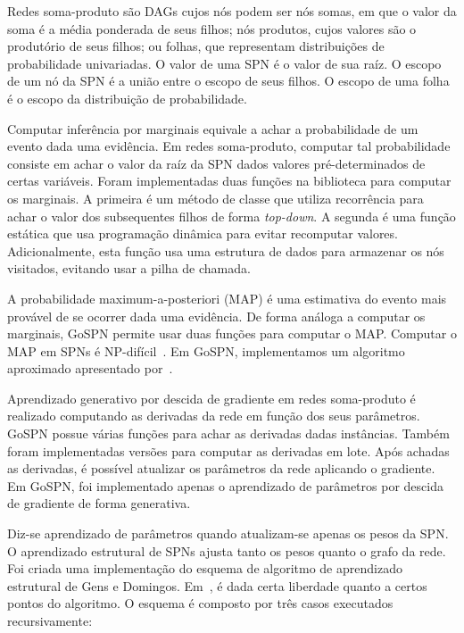 \documentclass[12pt]{article}
\theoremstyle{plain}
\numberwithin{equation}{section}
\begin{document}
Redes soma-produto são DAGs cujos nós podem ser nós somas, em que o valor da soma é a média
ponderada de seus filhos; nós produtos, cujos valores são o produtório de seus filhos; ou folhas,
que representam distribuições de probabilidade univariadas. O valor de uma SPN é o valor de sua
raíz. O escopo de um nó da SPN é a união entre o escopo de seus filhos. O escopo de uma folha é o
escopo da distribuição de probabilidade.

Computar inferência por marginais equivale a achar a probabilidade de um evento dada uma evidência.
Em redes soma-produto, computar tal probabilidade consiste em achar o valor da raíz da SPN dados
valores pré-determinados de certas variáveis. Foram implementadas duas funções na biblioteca para
computar os marginais. A primeira é um método de classe que utiliza recorrência para achar o valor
dos subsequentes filhos de forma \textit{top-down}. A segunda é uma função estática que usa
programação dinâmica para evitar recomputar valores. Adicionalmente, esta função usa uma estrutura
de dados para armazenar os nós visitados, evitando usar a pilha de chamada.

A probabilidade maximum-a-posteriori (MAP) é uma estimativa do evento mais provável de se ocorrer
dada uma evidência. De forma análoga a computar os marginais, GoSPN permite usar duas funções para
computar o MAP\@. Computar o MAP em SPNs é NP-difícil~\cite{peharz-spn,cmc2017}. Em GoSPN,
implementamos um algoritmo aproximado apresentado por~\cite{poon-domingos}.

Aprendizado generativo por descida de gradiente em redes soma-produto é realizado computando as
derivadas da rede em função dos seus parâmetros. GoSPN possue várias funções para achar as
derivadas dadas instâncias. Também foram implementadas versões para computar as derivadas em lote.
Após achadas as derivadas, é possível atualizar os parâmetros da rede aplicando o gradiente. Em
GoSPN, foi implementado apenas o aprendizado de parâmetros por descida de gradiente de forma
generativa.

Diz-se aprendizado de parâmetros quando atualizam-se apenas os pesos da SPN\@. O aprendizado
estrutural de SPNs ajusta tanto os pesos quanto o grafo da rede. Foi criada uma implementação do
esquema de algoritmo de aprendizado estrutural de Gens e Domingos. Em~\cite{gens-domingos}, é dada
certa liberdade quanto a certos pontos do algoritmo. O esquema é composto por três casos executados
recursivamente:
\end{document}
